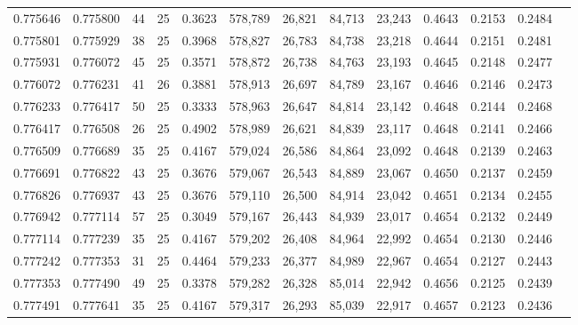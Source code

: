 \begin{tabular}{rrrrrrrrrrrrr}
0.775646 & 0.775800 &    44 &  25 &                                     0.3623 & 578,789 &  26,821 &  84,713 &  23,243 & 0.4643 & 0.2153 & 0.2484 \\
0.775801 & 0.775929 &    38 &  25 &                                     0.3968 & 578,827 &  26,783 &  84,738 &  23,218 & 0.4644 & 0.2151 & 0.2481 \\
0.775931 & 0.776072 &    45 &  25 &                                     0.3571 & 578,872 &  26,738 &  84,763 &  23,193 & 0.4645 & 0.2148 & 0.2477 \\
0.776072 & 0.776231 &    41 &  26 &                                     0.3881 & 578,913 &  26,697 &  84,789 &  23,167 & 0.4646 & 0.2146 & 0.2473 \\
0.776233 & 0.776417 &    50 &  25 &                                     0.3333 & 578,963 &  26,647 &  84,814 &  23,142 & 0.4648 & 0.2144 & 0.2468 \\
0.776417 & 0.776508 &    26 &  25 &                                     0.4902 & 578,989 &  26,621 &  84,839 &  23,117 & 0.4648 & 0.2141 & 0.2466 \\
0.776509 & 0.776689 &    35 &  25 &                                     0.4167 & 579,024 &  26,586 &  84,864 &  23,092 & 0.4648 & 0.2139 & 0.2463 \\
0.776691 & 0.776822 &    43 &  25 &                                     0.3676 & 579,067 &  26,543 &  84,889 &  23,067 & 0.4650 & 0.2137 & 0.2459 \\
0.776826 & 0.776937 &    43 &  25 &                                     0.3676 & 579,110 &  26,500 &  84,914 &  23,042 & 0.4651 & 0.2134 & 0.2455 \\
0.776942 & 0.777114 &    57 &  25 &                                     0.3049 & 579,167 &  26,443 &  84,939 &  23,017 & 0.4654 & 0.2132 & 0.2449 \\
0.777114 & 0.777239 &    35 &  25 &                                     0.4167 & 579,202 &  26,408 &  84,964 &  22,992 & 0.4654 & 0.2130 & 0.2446 \\
0.777242 & 0.777353 &    31 &  25 &                                     0.4464 & 579,233 &  26,377 &  84,989 &  22,967 & 0.4654 & 0.2127 & 0.2443 \\
0.777353 & 0.777490 &    49 &  25 &                                     0.3378 & 579,282 &  26,328 &  85,014 &  22,942 & 0.4656 & 0.2125 & 0.2439 \\
0.777491 & 0.777641 &    35 &  25 &                                     0.4167 & 579,317 &  26,293 &  85,039 &  22,917 & 0.4657 & 0.2123 & 0.2436 \\

\end{tabular}
